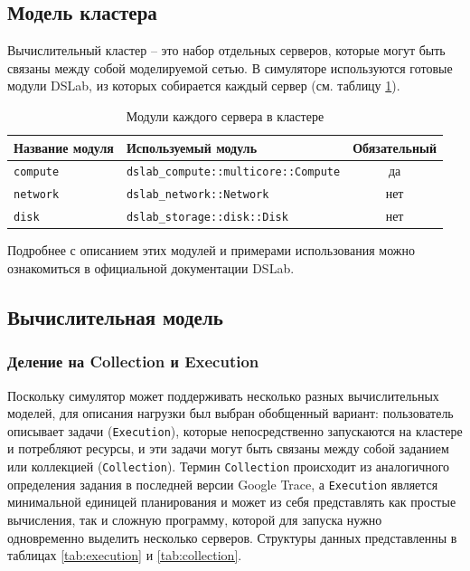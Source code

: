 \subsection{Модель кластера}\label{cluster-model}
Вычислительный кластер -- это набор отдельных серверов, которые могут быть связаны между собой моделируемой сетью. 
В симуляторе используются готовые модули DSLab, из которых собирается каждый сервер (см. таблицу \ref{tab:server_modules}). 
\begin{table}[h]
    \centering
    \begin{tabular}{|l|l|c|}
    \hline
    \textbf{Название модуля} & \textbf{Используемый модуль} & \textbf{Обязательный} \\
    \hline
    \texttt{compute} & \texttt{dslab\_compute::multicore::Compute} & да \\
    \hline
    \texttt{network} & \texttt{dslab\_network::Network} & нет  \\
    \hline
    \texttt{disk} & \texttt{dslab\_storage::disk::Disk} & нет \\
    \hline
    \end{tabular}
    \caption{Модули каждого сервера в кластере}
    \label{tab:server_modules}
\end{table}


Подробнее с описанием этих модулей и примерами использования можно ознакомиться в официальной документации DSLab\cite{dslab-compute-docs}\cite{dslab-network-docs}\cite{dslab-storage-docs}.

\subsection{Вычислительная модель}\label{compute-model}

\subsubsection{Деление на Collection и Execution}

Поскольку симулятор может поддерживать несколько разных вычислительных моделей, для описания нагрузки был выбран обобщенный вариант: пользователь описывает задачи (\texttt{Execution}), которые непосредственно запускаются на кластере и потребляют ресурсы, и эти задачи могут быть связаны между собой заданием или коллекцией (\texttt{Collection}). Термин \texttt{Collection} происходит из аналогичного определения задания в последней версии Google Trace\cite{google-clusterdata}, а \texttt{Execution} является минимальной единицей планирования и может из себя представлять как простые вычисления, так и сложную программу, которой для запуска нужно одновременно выделить несколько серверов. Структуры данных представленны в таблицах \ref{tab:execution} и \ref{tab:collection}.

